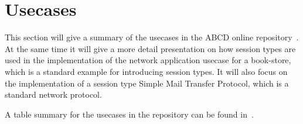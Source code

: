 \section{Usecases}



This section will give a summary of the usecases in
the ABCD online repository~\cite{usecase_repository}. At the
same time it will give a more detail presentation on
how session types are used in the implementation of the network application
usecase for a book-store, which is a standard example for introducing
session types. It will also focus on the implementation of a session type
Simple Mail Transfer Protocol, which is a standard network protocol.

A table summary for the usecases in the repository can be
found in~.

